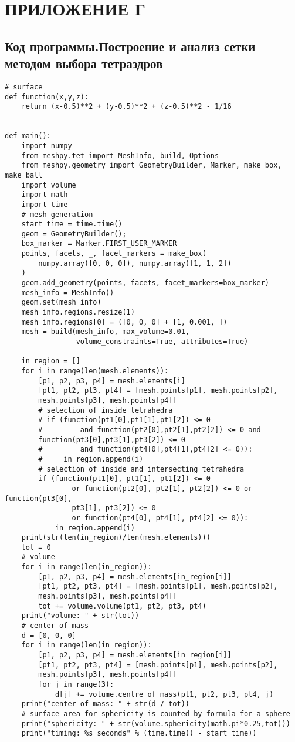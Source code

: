 \chapter*{ПРИЛОЖЕНИЕ Г}
\section*{\centering Код программы.Построение и анализ сетки методом выбора тетраэдров}
\begin{footnotesize}
\begin{lstlisting}
# surface
def function(x,y,z):
    return (x-0.5)**2 + (y-0.5)**2 + (z-0.5)**2 - 1/16


def main():
    import numpy
    from meshpy.tet import MeshInfo, build, Options
    from meshpy.geometry import GeometryBuilder, Marker, make_box, make_ball
    import volume
    import math
    import time
    # mesh generation
    start_time = time.time()
    geom = GeometryBuilder();
    box_marker = Marker.FIRST_USER_MARKER
    points, facets, _, facet_markers = make_box(
        numpy.array([0, 0, 0]), numpy.array([1, 1, 2])
    )
    geom.add_geometry(points, facets, facet_markers=box_marker)
    mesh_info = MeshInfo()
    geom.set(mesh_info)
    mesh_info.regions.resize(1)
    mesh_info.regions[0] = ([0, 0, 0] + [1, 0.001, ])
    mesh = build(mesh_info, max_volume=0.01,
                 volume_constraints=True, attributes=True)

    in_region = []
    for i in range(len(mesh.elements)):
        [p1, p2, p3, p4] = mesh.elements[i]
        [pt1, pt2, pt3, pt4] = [mesh.points[p1], mesh.points[p2],
        mesh.points[p3], mesh.points[p4]]
        # selection of inside tetrahedra
        # if (function(pt1[0],pt1[1],pt1[2]) <= 0
        #         and function(pt2[0],pt2[1],pt2[2]) <= 0 and
        function(pt3[0],pt3[1],pt3[2]) <= 0
        #         and function(pt4[0],pt4[1],pt4[2] <= 0)):
        #     in_region.append(i)
        # selection of inside and intersecting tetrahedra
        if (function(pt1[0], pt1[1], pt1[2]) <= 0
                or function(pt2[0], pt2[1], pt2[2]) <= 0 or function(pt3[0],
                pt3[1], pt3[2]) <= 0
                or function(pt4[0], pt4[1], pt4[2] <= 0)):
            in_region.append(i)
    print(str(len(in_region)/len(mesh.elements)))
    tot = 0
    # volume
    for i in range(len(in_region)):
        [p1, p2, p3, p4] = mesh.elements[in_region[i]]
        [pt1, pt2, pt3, pt4] = [mesh.points[p1], mesh.points[p2],
        mesh.points[p3], mesh.points[p4]]
        tot += volume.volume(pt1, pt2, pt3, pt4)
    print("volume: " + str(tot))
    # center of mass
    d = [0, 0, 0]
    for i in range(len(in_region)):
        [p1, p2, p3, p4] = mesh.elements[in_region[i]]
        [pt1, pt2, pt3, pt4] = [mesh.points[p1], mesh.points[p2],
        mesh.points[p3], mesh.points[p4]]
        for j in range(3):
            d[j] += volume.centre_of_mass(pt1, pt2, pt3, pt4, j)
    print("center of mass: " + str(d / tot))
    # surface area for sphericity is counted by formula for a sphere
    print("sphericity: " + str(volume.sphericity(math.pi*0.25,tot)))
    print("timing: %s seconds" % (time.time() - start_time))
    


\end{lstlisting}
\end{footnotesize}
